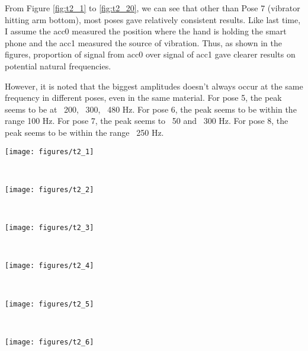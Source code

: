 \documentclass{sigchi}
\begin{document}
From Figure \ref{fig:t2_1} to \ref{fig:t2_20}, we can see that other than Pose 7 (vibrator hitting arm bottom), most poses gave relatively consistent results. Like last time, I assume the acc0 measured the position where the hand is holding the smart phone and the acc1 measured the source of vibration. Thus, as shown in the figures, proportion of signal from acc0 over signal of acc1 gave clearer results on potential natural frequencies.

However, it is noted that the biggest amplitudes doesn't always occur at the same frequency in different poses, even in the same material. For pose 5, the peak seems to be at ~200, ~300, ~480 Hz. For pose 6, the peak seems to be within the range 100 Hz. For pose 7, the peak seems to ~50 and ~300 Hz. For pose 8, the peak seems to be within the range ~250 Hz.

\begin{figure*}
  \centering
  \texttt{[image: figures/t2\_1]}
  \caption{accelerometer signals vs. frequency swept in pose 5 experiment 1}
    ~\label{fig:t2_1}
\end{figure*}

\begin{figure*}
  \centering
  \texttt{[image: figures/t2\_2]}
  \caption{accelerometer signals vs. frequency swept in pose 5 experiment 2}
    ~\label{fig:t2_2}
\end{figure*}

\begin{figure*}
  \centering
  \texttt{[image: figures/t2\_3]}
  \caption{accelerometer signals vs. frequency swept in pose 5 experiment 3}
    ~\label{fig:t2_3}
\end{figure*}

\begin{figure*}
  \centering
  \texttt{[image: figures/t2\_4]}
  \caption{accelerometer signals vs. frequency swept in pose 5 experiment 4}
    ~\label{fig:t2_4}
\end{figure*}

\begin{figure*}
  \centering
  \texttt{[image: figures/t2\_5]}
  \caption{accelerometer signals vs. frequency swept in pose 5 experiment 5}
    ~\label{fig:t2_5}
\end{figure*}

\begin{figure*}
  \centering
  \texttt{[image: figures/t2\_6]}
  \caption{accelerometer signals vs. frequency swept in pose 6 experiment 1}
    ~\label{fig:t2_6}
\end{figure*}
\end{document}
